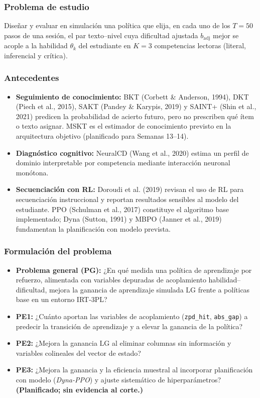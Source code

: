 \documentclass[10.5pt,a4paper]{article}
\newcommand{\code}[1]{\texttt{\color{InkDark}#1}}
\begin{document}
\subsubsection*{Problema de estudio}
Diseñar y evaluar en simulación una política que elija, en cada uno de los $T = 50$ pasos de una sesión, el par texto–nivel cuya dificultad ajustada $b_{\text{adj}}$ mejor se acople a la habilidad $\theta_k$ del estudiante en $K = 3$ competencias lectoras (literal, inferencial y crítica).

\subsubsection*{Antecedentes}
\begin{itemize}
  \item \textbf{Seguimiento de conocimiento:} BKT (Corbett \& Anderson, 1994), DKT (Piech et al., 2015), SAKT (Pandey \& Karypis, 2019) y SAINT+ (Shin et al., 2021) predicen la probabilidad de acierto futuro, pero no prescriben qué ítem o texto asignar. MSKT es el estimador de conocimiento previsto en la arquitectura objetivo (planificado para Semanas 13--14).
  \item \textbf{Diagnóstico cognitivo:} NeuralCD (Wang et al., 2020) estima un perfil de dominio interpretable por competencia mediante interacción neuronal monótona.
  \item \textbf{Secuenciación con RL:} Doroudi et al. (2019) revisan el uso de RL para secuenciación instruccional y reportan resultados sensibles al modelo del estudiante. PPO (Schulman et al., 2017) constituye el algoritmo base implementado; Dyna (Sutton, 1991) y MBPO (Janner et al., 2019) fundamentan la planificación con modelo prevista.
\end{itemize}

\subsubsection*{Formulación del problema}
\begin{itemize}
  \item \textbf{Problema general (PG):} ¿En qué medida una política de aprendizaje por refuerzo, alimentada con variables depuradas de acoplamiento habilidad--dificultad, mejora la ganancia de aprendizaje simulada $\mathrm{LG}$ frente a políticas base en un entorno IRT-3PL?
  \item \textbf{PE1:} ¿Cuánto aportan las variables de acoplamiento (\code{zpd\_hit}, \code{abs\_gap}) a predecir la transición de aprendizaje y a elevar la ganancia de la política?
  \item \textbf{PE2:} ¿Mejora la ganancia $\mathrm{LG}$ al eliminar columnas sin información y variables colineales del vector de estado?
  \item \textbf{PE3:} ¿Mejora la ganancia y la eficiencia muestral al incorporar planificación con modelo (\textit{Dyna-PPO}) y ajuste sistemático de hiperparámetros? \textcolor{AmberGold}{\textbf{(Planificado; sin evidencia al corte.)}}
\end{itemize}
\end{document}
